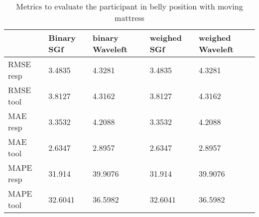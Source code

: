 \begin{table}
\begin{tabular}{|lllll|}
\hline 
& Binary SGf & binary Waveleft & weighed  SGf & weighed Waveleft \\ 

\hline 
RMSE resp &
     3.4835  &  4.3281 &   3.4835  &  4.3281 \\
RMSE  tool & 3.8127   & 4.3162   & 3.8127  &  4.3162 \\
MAE resp & 3.3532 &   4.2088 &     3.3532 &  4.2088 \\ 
MAE tool &     2.6347 & 2.8957 & 2.6347 &  2.8957 \\
MAPE resp & 31.914 & 39.9076 & 31.914 & 39.9076 \\ 
MAPE tool & 32.6041 & 36.5982 & 32.6041 & 36.5982 \\ 
\hline 
\end{tabular}

\caption{Metrics to evaluate the participant in belly position with moving mattress}
\end{table}
